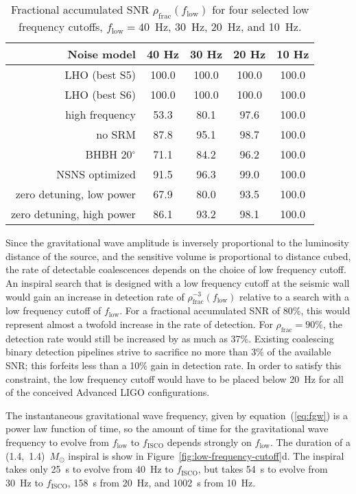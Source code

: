 \documentclass[preprint2]{aastex}
\newcommand{\Msun}{\ensuremath{M_{\odot}}}
\begin{document}
\begin{table}[h]
\begin{center}
\begin{tabular}{rcccc}
\hline\hline
Noise model & 40 Hz & 30 Hz & 20 Hz & 10 Hz \\
\hline
LHO (best S5) & 100.0 & 100.0 & 100.0 & 100.0 \\
LHO (best S6) & 100.0 & 100.0 & 100.0 & 100.0 \\
high frequency & 53.3 & 80.1 & 97.6 & 100.0 \\
no SRM & 87.8 & 95.1 & 98.7 & 100.0 \\
BHBH 20$^\circ$ & 71.1 & 84.2 & 96.2 & 100.0 \\
NSNS optimized & 91.5 & 96.3 & 99.0 & 100.0 \\
zero detuning, low power & 67.9 & 80.0 & 93.5 & 100.0 \\
zero detuning, high power & 86.1 & 93.2 & 98.1 & 100.0 \\
\hline
\end{tabular}
\end{center}
\caption{\label{table:accum_snr}Fractional accumulated SNR $\rho_\mathrm{frac}(f_\mathrm{low})$ for four selected low frequency cutoffs, $f_\mathrm{low}=40$~Hz, 30~Hz, 20~Hz, and 10~Hz.}
\end{table}

Since the gravitational wave amplitude is inversely proportional to the luminosity distance of the source, and the sensitive volume is proportional to distance cubed, the rate of detectable coalescences depends on the choice of low frequency cutoff.  An inspiral search that is designed with a low frequency cutoff at the seismic wall would gain an increase in detection rate of $\rho_\mathrm{frac}^{-3}(f_\mathrm{low})$ relative to a search with a low frequency cutoff of $f_\mathrm{low}$.  For a fractional accumulated SNR of 80\%, this would represent almost a twofold increase in the rate of detection.  For $\rho_\mathrm{frac} = 90\%$, the detection rate would still be increased by as much as 37\%.  Existing coalescing binary detection pipelines strive to sacrifice no more than 3\% of the available SNR; this forfeits less than a 10\% gain in detection rate.  In order to satisfy this constraint, the low frequency cutoff would have to be placed below 20~Hz for all of the conceived Advanced LIGO configurations.

The instantaneous gravitational wave frequency, given by equation~(\ref{eq:fgw}) is a power law function of time, so the amount of time for the gravitational wave frequency to evolve from $f_\mathrm{low}$ to $f_\mathrm{ISCO}$ depends strongly on $f_\mathrm{low}$.  The duration of a (1.4,~1.4)~$\Msun$ inspiral is show in Figure~\ref{fig:low-frequency-cutoff}d.  The inspiral takes only 25~s to evolve from 40~Hz to $f_\mathrm{ISCO}$, but takes 54~s to evolve from 30~Hz to $f_\mathrm{ISCO}$, 158~s from 20~Hz, and 1002~s from 10~Hz.
\end{document}
